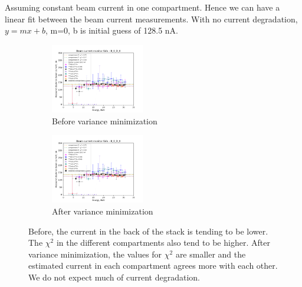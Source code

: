 \documentclass[a4paper,11pt,twoside]{book}
\begin{document}
Assuming constant beam current in one compartment. Hence we can have a linear fit between the beam current measurements. With no current degradation, $y=mx+b$, m=0, b is initial guess of 128.5 nA. 

\begin{figure}[t!]
  \centering
   \begin{subfigure}[t]{2\textwidth}
        \centering
        \includegraphics[height=1.2in]{Analysis/B_0_D_0.png}
        \caption{Before variance minimization}
    \end{subfigure}%
    \begin{subfigure}[t]{2\textwidth}
        \centering
        \includegraphics[height=1.2in]{Analysis/B_0_D_0.png}
        \caption{After variance minimization}
    \end{subfigure}
    \caption{Before, the current in the back of the stack is tending to be lower. The $\chi^2$ in the different compartments also tend to be higher. After variance minimization, the values for $\chi^2$ are smaller and the estimated current in each compartment agrees more with each other. We do not expect much of current degradation.}%
    \label{fig:varmin_beamcurrent}%
\end{figure}


    
\end{document}
